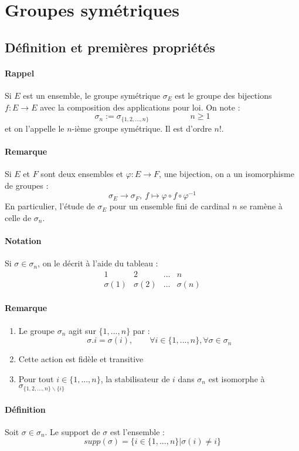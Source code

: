 \documentclass[a4paper, oneside]{report}
\newcommand{\defi}{\subsubsection{Définition}}
\newcommand{\remar}{\subsubsection{Remarque}}
\begin{document}
\chapter{Groupes symétriques}

\section{Définition et premières propriétés}

\subsubsection{Rappel}
Si $E$ est un ensemble, le groupe symétrique $\sigma_E$ est le groupe des bijections $f:E\rightarrow E$ avec la composition des applications pour loi. On note :
$$\sigma_n := \sigma_{\{1,2,...,n \}} \hspace{5em} n\geq 1$$
et on l'appelle le $n$-ième groupe symétrique. Il est d'ordre $n!$.

\remar
Si $E$ et $F$ sont deux ensembles et $\varphi:E\rightarrow F$, une bijection, on a un isomorphisme de groupes :
$$\sigma_E \rightarrow \sigma_F,~f\mapsto \varphi\circ f \circ \varphi^{-1}$$
En particulier, l'étude de $\sigma_E$ pour un ensemble fini de cardinal $n$ se ramène à celle de $\sigma_n$.

\subsubsection{Notation}
Si $\sigma\in \sigma_n$, on le décrit à l'aide du tableau :
$$\begin{array}{llll}
1&2&...&n\\
\sigma(1)&\sigma(2)&...&\sigma(n)
\end{array}$$

\remar
\begin{enumerate}
\item Le groupe $\sigma_n$ agit sur $\{1,...,n\}$ par :
$$\sigma.i=\sigma(i), \hspace{2em} \forall i\in \{1,...,n\}, \forall \sigma \in \sigma_n$$

\item Cette action est fidèle et transitive

\item Pour tout $i\in \{1,...,n\}$, la stabilisateur de $i$ dans $\sigma_n$ est isomorphe à $\sigma_{\{1,2,...,n \}\backslash \{i\}}$
\end{enumerate}

\defi
Soit $\sigma \in \sigma_n$. Le support de $\sigma$ est l'ensemble :
$$supp(\sigma)=\{i\in \{1,...,n \} | \sigma(i)\neq i \}$$
\end{document}
